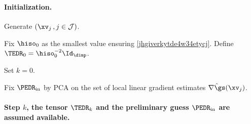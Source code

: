 \paragraph{Initialization.}
\begin{mylist}
\item
Generate \( (\xv_{j} \, , j \in \JJJ) \).

\item
Fix \( \hiso_{0} \) as the smallest value ensuring \eqref{jhgiverkytde4w34etycj}.
Define \( \TEDR_{0} = \hiso_{0}^{-2} \Id_{\dimp} \).

\item Set \( k=0 \).

\item
Fix \( \PEDR_{\init} \) by PCA on the set of local linear gradient estimates
\( \hat{\nabla \gs}(\xv_{j}) \).
\end{mylist}


\paragraph{Step \( k \), the tensor \( \TEDR_{k} \) and the preliminary guess \( \PEDR_{\init} \) are assumed 
available.}


